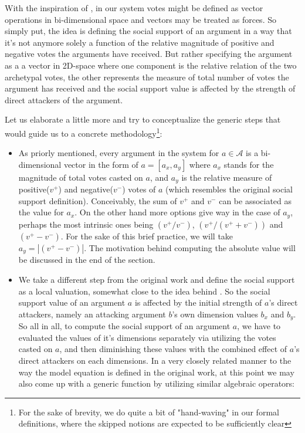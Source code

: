 \documentclass{article}
\begin{document}
 {\color{red}
With the inspiration of \cite{baroniTAB13}, in our system votes might be defined as vector operations in bi-dimensional space and vectors may be treated as forces. So simply put, the idea is defining the social support of an argument in a way that it's not anymore solely a function of the relative magnitude of positive and negative votes the arguments have received. But rather specifying the argument as a a vector in 2D-space where one component is the relative relation of the two archetypal votes, the other represents the measure of total number of votes the argument has received and the social support value is affected by the strength of direct attackers of the argument.


Let us elaborate a little more and try to conceptualize the generic steps that would guide us to a concrete methodology\footnote{For the sake of brevity, we do quite a bit of "hand-waving" in our formal definitions, where the skipped notions are expected to be sufficiently clear}:

\begin{itemize}
\item As priorly mentioned, every argument in the system for $ a \in \mathcal{A}$ is a bi-dimensional vector in the form of $ a = [a_{x}, a_{y}]$ where $a_{x}$ stands for the magnitude of total votes casted on $a$, and $a_{y}$ is the relative measure of positive($v^{+}$) and negative($v^{-}$) votes of $a$ (which resembles the original social support definition). 
Conceivably, the sum of $v^{+}$ and $v^{-}$ can be associated as the value for $a_{x}$. On the other hand more options give way in the case of $a_{y}$, perhaps the most intrinsic ones being   $(v^{+} / v^{-})$,  $(v^{+} / (v^{+}+v^{-}))$ and $(v^{+} - v^{-})$. For the sake of this brief practice, we will take $a_{y} = |(v^{+} - v^{-})|$. The motivation behind computing the absolute value will be discussed in the end of the section.
\item We take a different step from the original work and define the social support as a local valuation, somewhat close to the idea behind \cite{gradinarg}. So the social support value of an argument $a$ is affected by the initial strength of $a$'s direct attackers, namely an attacking argument $b$'s own dimension values $b_{x}$ and $ b_{y}$. So all in all, to compute the social support of an argument $a$, we have to evaluated the values of it's dimensions separately via utilizing the votes casted on $a$, and then diminishing these values with the combined effect of $a$'s direct attackers on each dimensions. In a very closely related manner to the way the model equation is defined in the original work, at this point we may also come up with a generic function by utilizing similar algebraic operators:


\end{itemize}}
\end{document}
